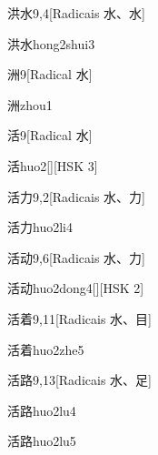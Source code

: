 \begin{entry}{洪水}{9,4}[Radicais ⽔、⽔]
  \begin{phonetics}{洪水}{hong2shui3}
  \end{phonetics}
\end{entry}

\begin{entry}{洲}{9}[Radical ⽔]
  \begin{phonetics}{洲}{zhou1}
  \end{phonetics}
\end{entry}

\begin{entry}{活}{9}[Radical ⽔]
  \begin{phonetics}{活}{huo2}[][HSK 3]
  \end{phonetics}
\end{entry}

\begin{entry}{活力}{9,2}[Radicais ⽔、⼒]
  \begin{phonetics}{活力}{huo2li4}
  \end{phonetics}
\end{entry}

\begin{entry}{活动}{9,6}[Radicais ⽔、⼒]
  \begin{phonetics}{活动}{huo2dong4}[][HSK 2]
  \end{phonetics}
\end{entry}

\begin{entry}{活着}{9,11}[Radicais ⽔、⽬]
  \begin{phonetics}{活着}{huo2zhe5}
  \end{phonetics}
\end{entry}

\begin{entry}{活路}{9,13}[Radicais ⽔、⾜]
  \begin{phonetics}{活路}{huo2lu4}
  \end{phonetics}
  \begin{phonetics}{活路}{huo2lu5}
  \end{phonetics}
\end{entry}


